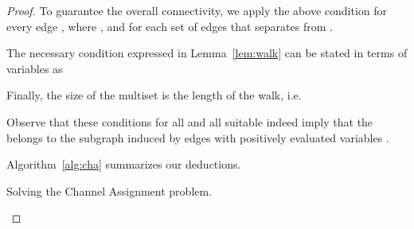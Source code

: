 \documentclass[a4paper,UKenglish]{lipics}
\theoremstyle{plain}
\theoremstyle{definition}
\begin{document}
{\begin{proof}
To guarantee the overall connectivity, we apply the above condition for every edge , 
where , and for each set of edges  
that separates  from . 

The necessary condition expressed in Lemma~\ref{lem:walk} can be stated in terms of variables  as



Finally, the size of the multiset is the length of the walk, i.e.



Observe that these conditions for all  and all suitable  indeed imply that the  
belongs to the subgraph induced by edges with positively evaluated variables .

Algorithm~\ref{alg:cha} summarizes our deductions.

\begin{algorithm}[h]
\caption{Solving the {\sc Channel Assignment} problem.}\label{alg:cha}
\end{algorithm}


\end{proof}}
\end{document}
